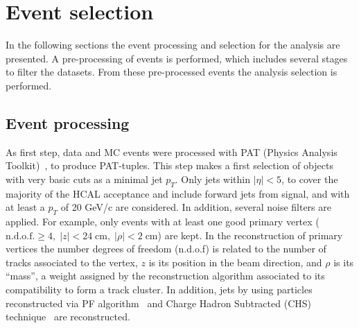 

\section{Event selection}
\label{sec:sel}

In the following sections the event processing and selection for the analysis are presented. A pre-processing of events is performed, which includes several stages to filter the datasets. From these pre-processed events the analysis selection is performed.

\subsection{Event processing}

As first step, data and MC events were processed with PAT (Physics Analysis Toolkit)~\cite{Adam:2010zza}, to produce PAT-tuples. This step makes a first selection of objects with very basic cuts as a minimal jet $p_{T}$. Only jets within $|\eta|<5$, to cover the majority of the HCAL acceptance and include forward jets from signal, and with at least a $p_{T}$ of 20 GeV/c are considered. In addition, several noise filters are applied. For example, only events with at least one good primary vertex ($\text{n.d.o.f.} \ge 4,\; |z|<24 \;\text{cm},\; |\rho|< 2 \;\text{cm}$) are kept. In the reconstruction of primary vertices the number degrees of freedom (n.d.o.f) is related to the number of tracks associated to the vertex, $z$ is its position in the beam direction, and $\rho$ is its ``mass'', a weight assigned by the reconstruction algorithm associated to its compatibility to form a track cluster. In addition, jets by using particles reconstructed via PF algorithm~\cite{CMS:2009nxa,CMS:2010eua,CMS:2010byl,CMS:2010aua} and Charge Hadron Subtracted (CHS) technique~\cite{Kirschenmann:1627818} are reconstructed. %

